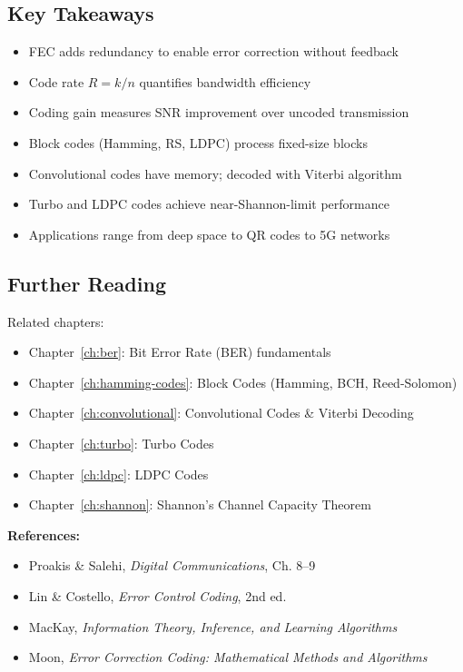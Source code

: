 \subsection{Key Takeaways}

\begin{itemize}
\item FEC adds redundancy to enable error correction without feedback
\item Code rate $R = k/n$ quantifies bandwidth efficiency
\item Coding gain measures SNR improvement over uncoded transmission
\item Block codes (Hamming, RS, LDPC) process fixed-size blocks
\item Convolutional codes have memory; decoded with Viterbi algorithm
\item Turbo and LDPC codes achieve near-Shannon-limit performance
\item Applications range from deep space to QR codes to 5G networks
\end{itemize}

\subsection{Further Reading}

Related chapters:
\begin{itemize}
\item Chapter~\ref{ch:ber}: Bit Error Rate (BER) fundamentals
\item Chapter~\ref{ch:hamming-codes}: Block Codes (Hamming, BCH, Reed-Solomon)
\item Chapter~\ref{ch:convolutional}: Convolutional Codes \& Viterbi Decoding
\item Chapter~\ref{ch:turbo}: Turbo Codes
\item Chapter~\ref{ch:ldpc}: LDPC Codes
\item Chapter~\ref{ch:shannon}: Shannon's Channel Capacity Theorem
\end{itemize}

\textbf{References:}
\begin{itemize}
\item Proakis \& Salehi, \textit{Digital Communications}, Ch. 8--9
\item Lin \& Costello, \textit{Error Control Coding}, 2nd ed.
\item MacKay, \textit{Information Theory, Inference, and Learning Algorithms}
\item Moon, \textit{Error Correction Coding: Mathematical Methods and Algorithms}
\end{itemize}

